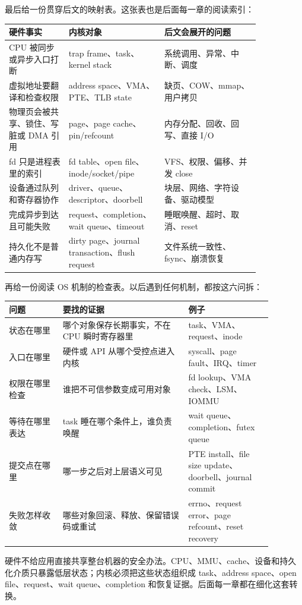 最后给一份贯穿后文的映射表。这张表也是后面每一章的阅读索引：

\begin{longtable}{p{0.2\linewidth}p{0.32\linewidth}p{0.32\linewidth}}
\toprule
硬件事实 & 内核对象 & 后文会展开的问题 \\
\midrule
CPU 被同步或异步入口打断 & trap frame、task、kernel stack & 系统调用、异常、中断、调度 \\
虚拟地址要翻译和检查权限 & address space、VMA、PTE、TLB state & 缺页、COW、mmap、用户拷贝 \\
物理页会被共享、锁住、写脏或 DMA 引用 & page、page cache、pin/refcount & 内存分配、回收、回写、直接 I/O \\
fd 只是进程表里的索引 & fd table、open file、inode/socket/pipe & VFS、权限、偏移、并发 close \\
设备通过队列和寄存器协作 & driver、queue、descriptor、doorbell & 块层、网络、字符设备、驱动模型 \\
完成异步到达且可能失败 & request、completion、wait queue、timeout & 睡眠唤醒、超时、取消、reset \\
持久化不是普通内存写 & dirty page、journal transaction、flush request & 文件系统一致性、fsync、崩溃恢复 \\
\bottomrule
\end{longtable}

再给一份阅读 OS 机制的检查表。以后遇到任何机制，都按这六问拆：

\begin{longtable}{p{0.18\linewidth}p{0.42\linewidth}p{0.28\linewidth}}
\toprule
问题 & 要找的证据 & 例子 \\
\midrule
状态在哪里 & 哪个对象保存长期事实，不在 CPU 瞬时寄存器里 & task、VMA、request、inode \\
入口在哪里 & 硬件或 API 从哪个受控点进入内核 & syscall、page fault、IRQ、timer \\
权限在哪里检查 & 谁把不可信参数变成可用对象 & fd lookup、VMA check、LSM、IOMMU \\
等待在哪里表达 & task 睡在哪个条件上，谁负责唤醒 & wait queue、completion、futex queue \\
提交点在哪里 & 哪一步之后对上层语义可见 & PTE install、file size update、doorbell、journal commit \\
失败怎样收敛 & 哪些对象回滚、释放、保留错误码或重试 & errno、request error、page refcount、reset recovery \\
\bottomrule
\end{longtable}

\begin{keyidea}
硬件不给应用直接共享整台机器的安全办法。CPU、MMU、cache、设备和持久化介质只暴露低层状态；内核必须把这些状态组织成 task、address space、open file、request、wait queue、completion 和恢复证据。后面每一章都在细化这套转换。
\end{keyidea}

